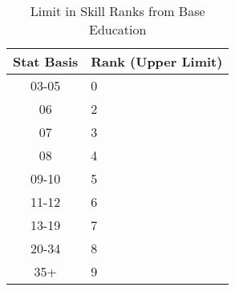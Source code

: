 
\begin{table}[h]
	\begin{tabular}{c|l}
	Stat Basis & Rank (Upper Limit) \\
	\hline
	03-05		& 0 \\
	06			& 2 \\
	07			& 3 \\
	08			& 4 \\
	09-10		& 5 \\
	11-12		& 6 \\
	13-19		& 7 \\
	20-34		& 8 \\
	35+			& 9 \\
    \end{tabular}
    \caption{Limit in Skill Ranks from Base Education}
\end{table}

